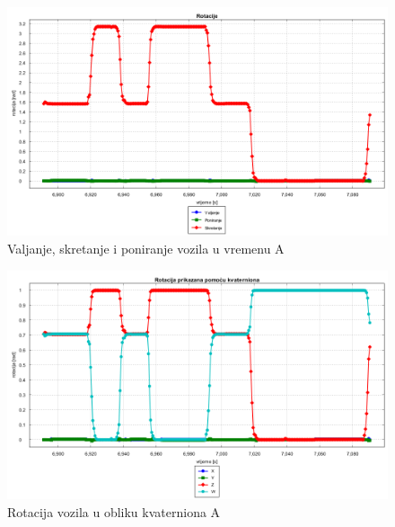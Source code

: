 \begin{figure}[H]
  \includegraphics[scale=0.4]{images/rotacija_vrijeme1.png}
  \caption{Valjanje, skretanje i poniranje vozila u vremenu A}
  \label{fig:gt1_rot_vr}
\end{figure}
\begin{figure}[H]
  \includegraphics[scale=0.4]{images/rotacija_kvaterni1.png}
  \caption{Rotacija vozila u obliku kvaterniona A}
  \label{fig:gt1_rot_kv}
\end{figure}

\newpage
